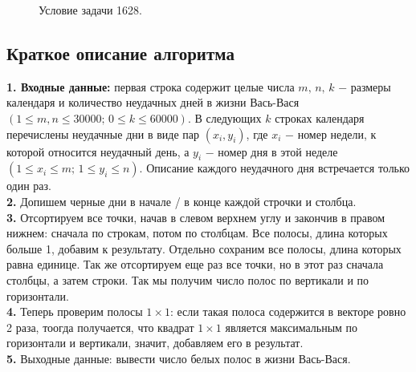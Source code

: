 \documentclass[a5paper, 10pt]{article}
\theoremstyle{definition}
\theoremstyle{plain}
\theoremstyle{remark}
\begin{document}
\begin{figure}[h!]
\caption{Условие задачи 1628.}
\end{figure}

\subsection{Краткое описание алгоритма}
\textbf{1. Входные данные:} первая строка содержит целые числа $m, \, n, \, k$ $-$ размеры календаря и количество неудачных дней в жизни Вась-Вася $(1 \leq m, n \leq 30000; \, 0 \leq k \leq 60000)$. В следующих $k$ строках календаря перечислены неудачные дни в виде пар $(x_i, y_i)$, где $x_i$ $-$ номер недели, к которой относится неудачный день, а $y_i$ $-$ номер дня в этой неделе $(1 \leq x_i \leq m; \, 1 \leq y_i \leq n)$. Описание каждого неудачного дня встречается только один раз. \\
\textbf{2.}  Допишем черные дни в начале / в конце каждой строчки и столбца.\\
\textbf{3.}  Отсортируем все точки, начав в слевом верхнем углу и закончив в правом нижнем: сначала по строкам, потом по столбцам. Все полосы, длина которых больше 1, добавим к результату. Отдельно сохраним все полосы, длина которых равна единице. Так же отсортируем еще раз все точки, но в этот раз сначала столбцы, а затем строки. Так мы получим число полос по вертикали и по горизонтали. \\
\textbf{4.}  Теперь проверим полосы $1 \times 1$: если такая полоса содержится в векторе ровно 2 раза, тоогда получается, что квадрат $1 \times 1$ является максимальным по горизонтали и вертикали, значит, добавляем его в результат. \\
\textbf{5.} Выходные данные: вывести число белых полос в жизни Вась-Вася.
\end{document}
